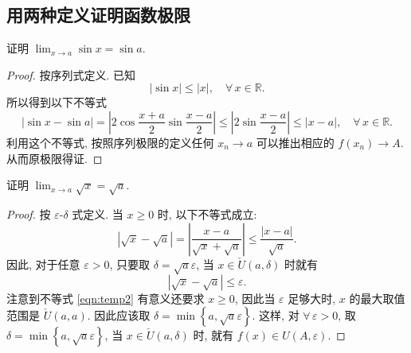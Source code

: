 \documentclass{book}
\newcommand{\Any}{\forall\,}
\newcommand{\set}[1]{\left\{#1\right\}}
\newcommand{\abs}[1]{\left\lvert #1 \right\rvert}
\newcommand{\R}{\mathbb{R}}
\newcommand{\puncU}[1]{\check{U}\!\left( #1 \right)}
\renewcommand{\U}[1]{U\!\left( #1 \right)}%
\renewcommand{\ge}{\geqslant}
\renewcommand{\le}{\leqslant}
\numberwithin{equation}{section}
\numberwithin{figure}{section}
\theoremstyle{definition}
\begin{document}
\subsection{用两种定义证明函数极限}
\label{proof:LimitofFunctionBySequence}
证明 $\lim_{x\to a }\sin x=\sin a$.
\begin{proof}
  按序列式定义.
  已知
  \begin{equation*}
    \abs{\sin x}\le\abs{x},\quad\Any x\in\R.
  \end{equation*}
  所以得到以下不等式
  \begin{equation*}
    \abs{\sin x-\sin a}=\abs{2\cos\frac{x+a}{2}\sin \frac{x-a}{2}}\le\abs{2\sin\frac{x-a}{2}}\le\abs{x-a},\quad\Any x\in\R.
  \end{equation*}
  利用这个不等式, 按照序列极限的定义任何 $x_n\to a$ 可以推出相应的 $f(x_n)\to A$.
  从而原极限得证.
\end{proof}

证明 $\lim_{x\to a}\sqrt{x}=\sqrt{a}$.
\begin{proof}
  按 $\varepsilon$-$\delta$ 式定义.
  当 $x\ge0$ 时, 以下不等式成立:
  \begin{equation}
    \abs{\sqrt{x}-\sqrt{a}}=\abs{\frac{x-a}{\sqrt{x}+\sqrt{a}}}\le\frac{\abs{x-a}}{\sqrt{a}}.
    \label{eqn:temp2}
  \end{equation}
  因此, 对于任意 $\varepsilon>0$, 只要取 $\delta=\sqrt{a}\varepsilon$, 当 $x\in\puncU{a,\delta}$ 时就有
  \begin{equation*}
    \abs{\sqrt{x}-\sqrt{a}}\le\varepsilon.
  \end{equation*}
  注意到不等式 \eqref{eqn:temp2} 有意义还要求 $x\ge0$, 因此当 $\varepsilon$ 足够大时, $x$ 的最大取值范围是 $\puncU{a,a}$.
  因此应该取 $\delta=\min\set{{a,\sqrt{a}\varepsilon}}$.
  这样, 对 $\Any\varepsilon>0$, 取 $\delta=\min\set{{a,\sqrt{a}\varepsilon}}$, 当 $x\in\puncU{a,\delta}$ 时, 就有 $f(x)\in\U{A,\varepsilon}$.
\end{proof}
\end{document}
